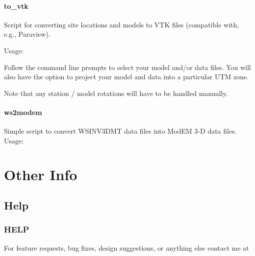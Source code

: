 \documentclass[letterpaper,10pt,english]{sphinxmanual}
\begin{document}
\subsubsection{to\_vtk}
\label{\detokenize{content/examples/scripts:to-vtk}}
Script for converting site locations and models to VTK files (compatible with, e.g., Paraview).

Usage:

\begin{sphinxVerbatim}[commandchars=\\\{\}]
\end{sphinxVerbatim}

Follow the command line prompts to select your model and/or data files. You will also have the option to project your model and data into a particular UTM zone.

Note that any station / model rotations will have to be handled manually.


\subsubsection{ws2modem}
\label{\detokenize{content/examples/scripts:ws2modem}}
Simple script to convert WSINV3DMT data files into ModEM 3-D data files.
Usage:

\begin{sphinxVerbatim}[commandchars=\\\{\}]
  
\end{sphinxVerbatim}


\chapter{Other Info}
\label{\detokenize{index:other-info}}

\section{Help}
\label{\detokenize{index:help}}

\subsection{HELP}
\label{\detokenize{content/misc/help:help}}\label{\detokenize{content/misc/help::doc}}
For feature requests, bug fixes, design suggestions, or anything else contact me at 
\end{document}
